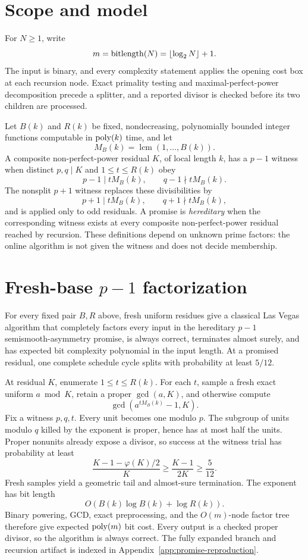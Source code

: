 \documentclass[11pt]{article}
\begin{document}
\section{Scope and model}

For \(N\ge1\), write
\[
  m=\operatorname{bitlength}(N)=\lfloor\log_2N\rfloor+1.
\]
The input is binary, and every complexity statement applies the opening cost
box at each recursion node.  Exact primality testing and
maximal-perfect-power decomposition precede a splitter, and a reported
divisor is checked before its two children are processed.

Let \(B(k)\) and \(R(k)\) be fixed, nondecreasing, polynomially bounded
integer functions computable in \(\operatorname{poly}(k)\) time, and let
\[
  M_B(k)=\operatorname{lcm}(1,\ldots,B(k)).
\]
A composite non-perfect-power residual \(K\), of local length \(k\), has a
\(p-1\) witness when distinct \(p,q\mid K\) and \(1\le t\le R(k)\) obey
\[
  p-1\mid tM_B(k),\qquad q-1\nmid tM_B(k).
\]
The nonsplit \(p+1\) witness replaces these divisibilities by
\[
  p+1\mid tM_B(k),\qquad q+1\nmid tM_B(k),
\]
and is applied only to odd residuals.  A promise is \emph{hereditary} when
the corresponding witness exists at every composite non-perfect-power
residual reached by recursion.  These definitions depend on unknown prime
factors: the online algorithm is not given the witness and does not decide
membership.

\section{Fresh-base \texorpdfstring{\(p-1\)}{p-1} factorization}

{}
For every fixed pair \(B,R\) above, fresh
uniform residues give a classical Las Vegas algorithm that completely
factors every input in the hereditary \(p-1\) semismooth-asymmetry promise,
is always correct, terminates almost surely, and has expected bit complexity
polynomial in the input length.  At a promised residual, one complete
schedule cycle splits with probability at least \(5/12\).

\begin{claimproof}
At residual \(K\), enumerate \(1\le t\le R(k)\).  For each \(t\), sample a
fresh exact uniform \(a\bmod K\), retain a proper \(\gcd(a,K)\), and otherwise
compute
\[
  \gcd\!\left(a^{tM_B(k)}-1,K\right).
\]
Fix a witness \(p,q,t\).  Every unit becomes one modulo \(p\).  The subgroup
of units modulo \(q\) killed by the exponent is proper, hence has at most
half the units.  Proper nonunits already expose a divisor, so success at the
witness trial has probability at least
\[
 \frac{K-1-\varphi(K)/2}{K}
 \ge \frac{K-1}{2K}\ge\frac5{12}.
\]
Fresh samples yield a geometric tail and almost-sure termination.  The
exponent has bit length
\[
O(B(k)\log B(k)+\log R(k)).
\]
Binary powering, GCD, exact
preprocessing, and the \(O(m)\)-node factor tree therefore give expected
\(\operatorname{poly}(m)\) bit cost.  Every output is a checked proper divisor, so the
algorithm is always correct.  The fully expanded branch and recursion
artifact is indexed in Appendix~\ref{app:promise-reproduction}.
\end{claimproof}
\end{document}
